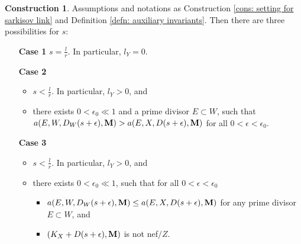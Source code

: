 \documentclass[11pt]{amsart}
\numberwithin{equation}{section}
\newcommand{\Mm}{{\bf{M}}}
\theoremstyle{definition}
\theoremstyle{definition}
\newtheorem{cons}[thm]{Construction}
\theoremstyle{definition}
\begin{document}
\begin{cons}\label{cons: cases of sarkisov link with scaling}
Assumptions and notations as Construction \ref{cons: setting for sarkisov link} and Definition \ref{defn: auxiliary invariants}. Then there are three possibilities for $s$:
\begin{itemize}
   \item[\textbf{Case 1}] $s=\frac{l}{r}$. In particular, $l_Y=0.$
    \item[\textbf{Case 2}] 
    \begin{itemize}
        \item $s<\frac{l}{r}$. In particular, $l_Y>0$, and 
        \item there exists $0<\epsilon_{0}\ll 1$ and a prime divisor $E\subset W$, such that $a(E,W,D_W(s+\epsilon),\Mm)>a(E,X,D(s+\epsilon),\Mm)$ for all $0<\epsilon<\epsilon_{0}$.
    \end{itemize}
        \item[\textbf{Case 3}] 
    \begin{itemize}
        \item $s<\frac{l}{r}$. In particular, $l_Y>0$, and 
        \item there exists $0<\epsilon_{0}\ll 1$, such that for all $0<\epsilon<\epsilon_{0}$ 
        \begin{itemize}
            \item $a(E,W,D_W(s+\epsilon),\Mm)\leq a(E,X,D(s+\epsilon),\Mm)$ for any prime divisor $E\subset W$, and
            \item $(K_X+D(s+\epsilon),\Mm)$ is not nef$/Z$.
        \end{itemize} 
    \end{itemize}
\end{itemize}
\end{cons}
\end{document}
